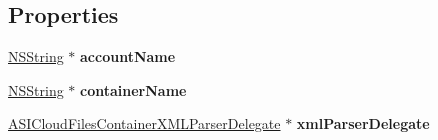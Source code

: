 \subsection*{\-Properties}
\begin{DoxyCompactItemize}
\item 
\hypertarget{interface_a_s_i_cloud_files_c_d_n_request_aced38cd435e42072fb9f30e98d31e1d5}{
\hyperlink{class_n_s_string}{\-N\-S\-String} $\ast$ {\bfseries account\-Name}}
\label{interface_a_s_i_cloud_files_c_d_n_request_aced38cd435e42072fb9f30e98d31e1d5}

\item 
\hypertarget{interface_a_s_i_cloud_files_c_d_n_request_a45f12973038a6f8be361207975e57c20}{
\hyperlink{class_n_s_string}{\-N\-S\-String} $\ast$ {\bfseries container\-Name}}
\label{interface_a_s_i_cloud_files_c_d_n_request_a45f12973038a6f8be361207975e57c20}

\item 
\hypertarget{interface_a_s_i_cloud_files_c_d_n_request_ab818724b0fba73ce0a4ee934ed4f62bc}{
\hyperlink{interface_a_s_i_cloud_files_container_x_m_l_parser_delegate}{\-A\-S\-I\-Cloud\-Files\-Container\-X\-M\-L\-Parser\-Delegate} $\ast$ {\bfseries xml\-Parser\-Delegate}}
\label{interface_a_s_i_cloud_files_c_d_n_request_ab818724b0fba73ce0a4ee934ed4f62bc}

\end{DoxyCompactItemize}


